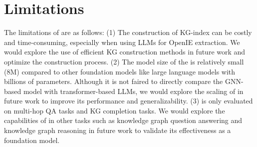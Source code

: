 \section{Limitations}\label{app:Limitation}

The limitations of \ourmethod are as follows: (1) The construction of KG-index can be costly and time-consuming, especially when using LLMs for OpenIE extraction. We would explore the use of efficient KG construction methods in future work and optimize the construction process. (2) The model size of the \ourmethod is relatively small (8M) compared to other foundation models like large language models with billions of parameters. Although it is not faired to directly compare the GNN-based model with transformer-based LLMs, we would explore the scaling of \ourmethod in future work to improve its performance and generalizability. (3) \ourmethod is only evaluated on multi-hop QA tasks and KG completion tasks. We would explore the capabilities of \ourmethod in other tasks such as knowledge graph question answering and knowledge graph reasoning in future work to validate its effectiveness as a foundation model.

